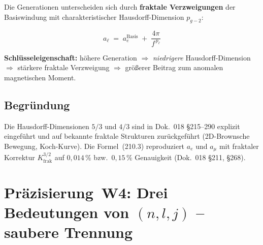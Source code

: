 Die Generationen unterscheiden sich durch \textbf{fraktale
Verzweigungen} der Basiswindung mit charakteristischer
Hausdorff-Dimension $p_{g\!-\!2}$:

\begin{equation}
  a_\ell \;=\; a_e^{\text{Basis}} \;+\; \frac{4\pi}{f^{\,p_{\ell}}}
  \tag{210.3}
\end{equation}

\begin{center}
\renewcommand{\arraystretch}{1.3}
{\footnotesize
{}
}
\renewcommand{\arraystretch}{1.0}
\end{center}

\textbf{Schlüsseleigenschaft:} höhere Generation $\Rightarrow$
\emph{niedrigere} Hausdorff-Dimension $\Rightarrow$ stärkere fraktale
Verzweigung $\Rightarrow$ größerer Beitrag zum anomalen magnetischen
Moment.

\subsection*{Begründung}

Die Hausdorff-Dimensionen $5/3$ und $4/3$ sind in Dok.~018 §215--290
explizit eingeführt und auf bekannte fraktale Strukturen zurückgeführt
(2D-Brownsche Bewegung, Koch-Kurve). Die Formel~(210.3) reproduziert
$a_e$ und $a_\mu$ mit fraktaler Korrektur $K_{\text{frak}}^{3/2}$ auf
$0{,}014\,\%$ bzw.\ $0{,}15\,\%$ Genauigkeit (Dok.~018 §211, §268).

\section{\texorpdfstring{Präzisierung~W4: Drei Bedeutungen von $(n,l,j)$ -- saubere Trennung}{Praezisierung W4: Drei Bedeutungen von (n,l,j)}}

